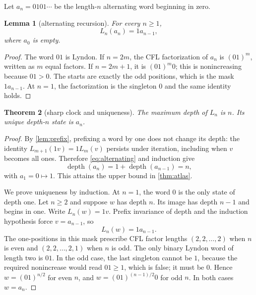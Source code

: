 \documentclass[10pt,a4paper]{amsart}
\newtheorem{theorem}{Theorem}[section]
\newtheorem{lemma}[theorem]{Lemma}
\theoremstyle{definition}
\theoremstyle{remark}
\newcommand{\depth}{\operatorname{depth}}
\begin{document}
Let $a_n=0101\cdots$ be the length-$n$ alternating word beginning in zero.

\begin{lemma}[alternating recursion]\label{lem:alternating}
For every $n\ge1$,
\begin{equation}\label{eq:alternating}
 L_n(a_n)=1a_{n-1},
\end{equation}
where $a_0$ is empty.
\end{lemma}

\begin{proof}
The word $01$ is Lyndon.  If $n=2m$, the CFL factorization of $a_n$ is
$(01)^m$, written as $m$ equal factors.  If $n=2m+1$, it is
$(01)^m0$; this is nonincreasing because $01>0$.  The starts are exactly the
odd positions, which is the mask $1a_{n-1}$.  At $n=1$, the factorization is
the singleton $0$ and the same identity holds.
\end{proof}

\begin{theorem}[sharp clock and uniqueness]\label{thm:unique}
The maximum depth of $L_n$ is $n$.  Its unique depth-$n$ state is $a_n$.
\end{theorem}

\begin{proof}
By \cref{lem:prefix}, prefixing a word by one does not change its depth:
the identity $L_{m+1}(1v)=1L_m(v)$ persists under iteration, including when
$v$ becomes all ones.  Therefore \eqref{eq:alternating} and induction give
\[
 \depth(a_n)=1+\depth(a_{n-1})=n,
\]
with $a_1=0\mapsto1$.  This attains the upper bound in \cref{thm:atlas}.

We prove uniqueness by induction.  At $n=1$, the word $0$ is the only state
of depth one.  Let $n\ge2$ and suppose $w$ has depth $n$.  Its image has depth
$n-1$ and begins in one.  Write $L_n(w)=1v$.  Prefix invariance of depth and
the induction hypothesis force $v=a_{n-1}$, so
\begin{equation}\label{eq:forcedmask}
 L_n(w)=1a_{n-1}.
\end{equation}
The one-positions in this mask prescribe CFL factor lengths
$(2,2,\ldots,2)$ when $n$ is even and $(2,2,\ldots,2,1)$ when $n$ is odd.
The only binary Lyndon word of length two is $01$.  In the odd case, the last
singleton cannot be $1$, because the required nonincrease would read
$01\ge1$, which is false; it must be $0$.  Hence $w=(01)^{n/2}$ for even
$n$, and $w=(01)^{(n-1)/2}0$ for odd $n$.  In both cases $w=a_n$.
\end{proof}
\end{document}
